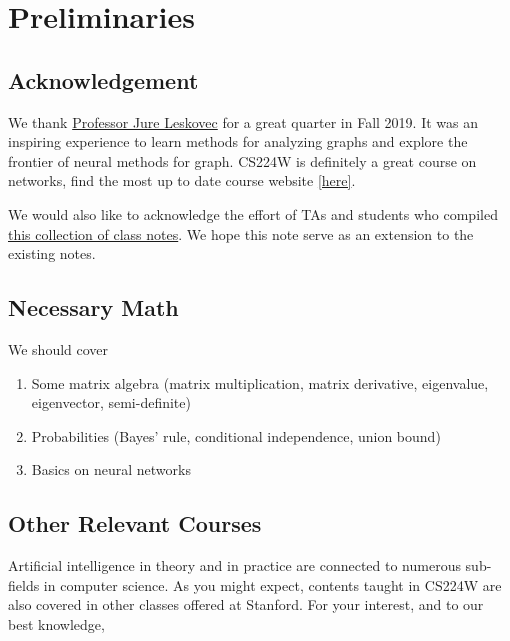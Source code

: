 \section{Preliminaries}

\subsection{Acknowledgement}\label{ss_01}

We thank \href{https://cs.stanford.edu/people/jure/}{Professor Jure Leskovec} for a great quarter in Fall 2019. It was an inspiring experience to learn methods for analyzing graphs and explore the frontier of neural methods for graph. CS224W is definitely a great course on networks, find the most up to date course website \href{https://web.stanford.edu/class/cs224w/}{[here]}.

We would also like to acknowledge the effort of TAs and students who compiled \href{https://snap-stanford.github.io/cs224w-notes/}{this collection of class notes}. We hope this note serve as an extension to the existing notes.

\subsection{Necessary Math}\label{ss_02}

\begin{todo}
We should cover
\begin{enumerate}
    \item Some matrix algebra (matrix multiplication, matrix derivative, eigenvalue, eigenvector, semi-definite)

    \item Probabilities (Bayes' rule, conditional independence, union bound)
    
    \item Basics on neural networks

\end{enumerate}{}

\end{todo}{}

\subsection{Other Relevant Courses}\label{ss_03}

Artificial intelligence in theory and in practice are connected to numerous sub-fields in computer science. As you might expect, contents taught in CS224W are also covered in other classes offered at Stanford. For your interest, and to our best knowledge, 

